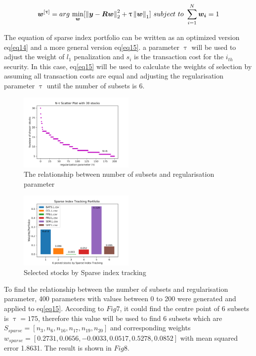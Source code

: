 \documentclass[sigconf]{acmart}
\begin{document}
\begin{itemize}
\begin{equation} \label{eq15}
\setlength{\abovedisplayskip}{3pt}
\setlength{\belowdisplayskip}{3pt}
\bm{w}^{[\uptau]}=arg\,\min\limits_{\bm{w}}[\left \| \bm{y}-\bm{Rw} \right \|_{2}^{2}+\uptau \left \| \bm{w} \right \|_{1}] \ subject\ to\ \sum_{i=1}^{N}\bm{w_{i}}=1
\end{equation}

The equation of sparse index portfolio can be written as an optimized version eq\eqref{eq14} and a more general version eq\eqref{eq15}. a parameter $\uptau$ will be used to adjust the weight of $l_{1}$ penalization and $s_{i}$ is the transaction cost for the $i_{th}$ security\cite{brodie2009sparse}. In this case, eq\eqref{eq15} will be used to calculate the weights of selection by assuming all transaction costs are equal and adjusting the regularisation parameter $\uptau$ until the number of subsets is 6.

\begin{figure}[htbp]
    \centering
    \includegraphics[width=0.5\textwidth]{9.png}
    \caption{\label{}The relationship between number of subsets and regularisation parameter}
\end{figure}

\begin{figure}[htbp]
    \centering
    \includegraphics[width=0.5\textwidth]{10.png}
    \caption{\label{}Selected stocks by Sparse index tracking}
\end{figure}

To find the relationship between the number of subsets and regularisation parameter, 400 parameters with values between 0 to 200 were generated and applied to eq\eqref{eq15}. According to $Fig7$, it could find the centre point of 6 subsets is $\uptau=175$, therefore this value will be used to find 6 subsets which are $S_{sparse}=[n_{3},n_{6},n_{16},n_{17},n_{19},n_{20}]$ and corresponding weights $w_{sparse}=[0.2731,0.0656,-0.0033,0.0517,0.5278,0.0852]$ with mean squared error 1.8631. The result is shown in $Fig8$. ~\\

\end{itemize}
\end{document}
